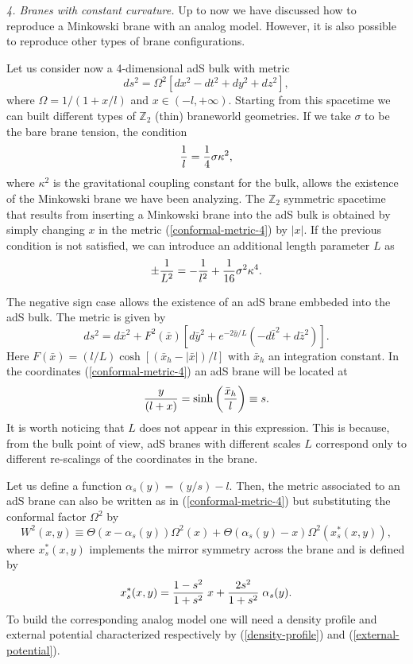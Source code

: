 \documentclass[a4paper,prl,showpacs,twocolumn]{revtex4}
\begin{document}
\noindent
{\it 4. Branes with constant curvature.}
Up to now we have discussed how to reproduce a Minkowski brane
with an analog model. However, it is also possible to reproduce
other types of brane configurations.  

Let us consider now a 4-dimensional adS bulk with metric
%
\begin{equation}
ds^2 =  \Omega^2[dx^2-dt^2+dy^2+dz^2], 
\label{conformal-metric-4}
\end{equation}
%
where  $\Omega=1/(1+x/l)$ and
$x \in (-l,+\infty)$.
Starting from this spacetime we can built different types of $\mathbb{Z}_2$ 
(thin) braneworld geometries. If we take $\sigma$ to be 
the bare brane tension, the condition
%
\begin{equation}
{1 \over l}={1 \over 4 }\sigma \kappa^2,  
\end{equation}
%
where $\kappa^2$ is the gravitational coupling constant for the bulk, 
allows the existence of the Minkowski brane 
we have been analyzing. 
The $\mathbb{Z}_2$ symmetric spacetime that results from inserting 
a Minkowski brane into the adS bulk is obtained by simply changing $x$ 
in the metric (\ref{conformal-metric-4}) by $|x|$.
If the previous condition is not satisfied, we can introduce 
an additional length parameter $L$ as
%
\begin{equation}
\pm {1 \over L^2}=-{1 \over l^2}+{1 \over 16}\sigma^2 \kappa^4.  
\end{equation}
%

The negative sign case allows the existence of an adS
brane embbeded into the adS bulk. The metric is given by \cite{dewolfe}
%
\[
ds^2 = d {\bar x}^2 + 
F^2({\bar x})
\left[ d{\bar y}^2+ e^{-2{\bar y}/L} 
(-d{\bar t}^2+d{\bar z}^2) \right].
\]
%
Here $F({\bar x})=(l/L)\cosh[({\bar x}_h-|{\bar x}|)/l]$
with ${\bar x}_h$ an integration constant.
In the coordinates (\ref{conformal-metric-4}) an adS
brane will be located at
%
\begin{equation}
{y \over (l+x)}=\sinh\left({{\bar x}_h \over l}\right)\equiv s.
\end{equation}
%
It is worth noticing that $L$ does not appear in this expression.
This is because, from the bulk point of view, adS branes 
with different scales $L$ correspond only to different re-scalings of 
the coordinates in the brane. 

Let us define a function $\alpha_s(y)=(y/s)-l$.
Then, the metric associated to an adS brane
can also be written as in (\ref{conformal-metric-4}) but
substituting the conformal factor $\Omega^2$ by 
%
\[
W^2(x,y)\equiv \Theta(x-\alpha_s(y)) \Omega^2(x)+
\Theta(\alpha_s(y)-x)\Omega^2
\left(x_s^*(x,y)\right),
\]
%
where $x_s^*(x,y)$ implements the mirror symmetry across the brane
and is defined by
%
\begin{equation}
x_s^*(x,y)={1-s^2 \over 1+s^2}\;x + {2s^2 \over 1+s^2}
\;\alpha_s(y).
\end{equation}
%
To build the corresponding analog model one will
need a density profile and external potential characterized 
respectively by (\ref{density-profile}) and (\ref{external-potential}).
\end{document}
